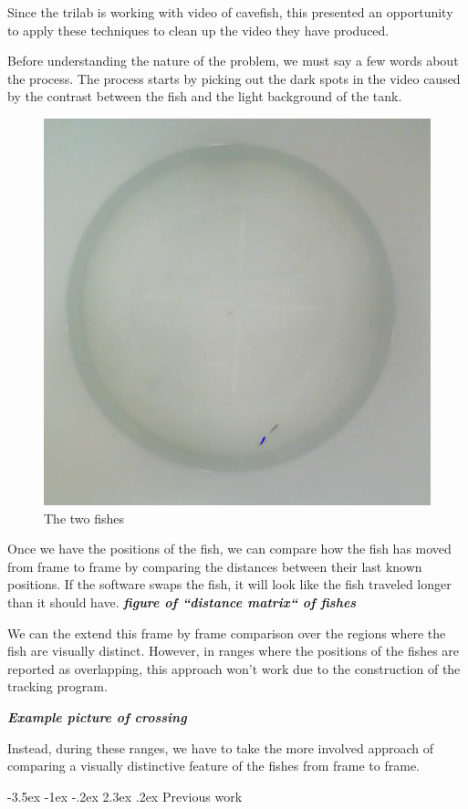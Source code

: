 \documentclass{article}
\makeatletter
\renewcommand\section{\clearpage\newpage\@startsection {section}{1}{\z@}%
	{-3.5ex \@plus -1ex \@minus -.2ex}%
	{2.3ex \@plus.2ex}%
	{\normalfont\Large\bfseries}}
\makeatother
\begin{document}
Since the trilab is working with video of cavefish, this presented an opportunity to apply these techniques to clean up the video they have produced.

Before understanding the nature of the problem, we must say a few words about the process. The process starts by picking out the dark spots in the video caused by the contrast between the fish and the light background of the tank.

\begin{figure}[H]
	\centering
	\includegraphics[width=.75\linewidth]{fish}
	\caption{The two fishes}
	\label{fig:fish}
\end{figure}

Once we have the positions of the fish, we can compare how the fish has moved from frame to frame by comparing the distances between their last known positions. If the software swaps the fish, it will look like the fish traveled longer than it should have.
\textbf{\textit{figure of ``distance matrix`` of fishes}}

We can the extend this frame by frame comparison over the regions where the fish are visually distinct. However, in ranges where the positions of the fishes are reported as overlapping, this approach won't work due to the construction of the tracking program. 

\textbf{\textit{Example picture of crossing}}

Instead, during these ranges, we have to take the more involved approach of comparing a visually distinctive feature of the fishes from frame to frame.

\section{Previous work}
\end{document}
